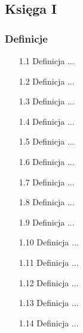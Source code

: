 \subsection{Księga I}	
\subsubsection{Definicje}	
\begin{enumerate}	
    \item [1.1] Definicja ... %
    \item [1.2] Definicja ... %
    \item [1.3] Definicja ... %
    \item [1.4] Definicja ... %
    \item [1.5] Definicja ... %
    \item [1.6] Definicja ... %
    \item [1.7] Definicja ... %
    \item [1.8] Definicja ... %
    \item [1.9] Definicja ... %
    \item [1.10] Definicja ... %
    \item [1.11] Definicja ... %
    \item [1.12] Definicja ... %
    \item [1.13] Definicja ... %
    \item [1.14] Definicja ... %

\end{enumerate}

